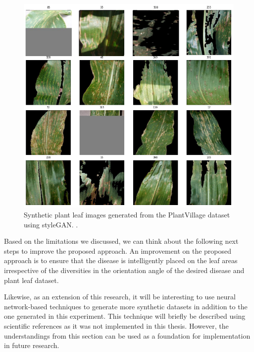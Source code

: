 \begin{figure}[!htb]
    \centering
    \includegraphics[scale=0.5, keepaspectratio]{Figures/notebook/bad-seg-dis.png}
    \caption{Synthetic plant leaf images generated from the PlantVillage dataset using styleGAN. \cite{arsenovic2019solving}.}
    \label{fig:my_bad_seg_img}
\end{figure} 




Based on the limitations we discussed, we can think about the following next steps to improve the proposed approach. 
An improvement on the proposed approach is to ensure that the disease is intelligently placed on the leaf areas irrespective of the diversities in the orientation angle of the desired disease and plant leaf dataset. 

Likewise, as an extension of this research, it will be interesting to use neural network-based techniques to generate more synthetic datasets in addition to the one generated in this experiment. This technique will briefly be described using scientific references as it was not implemented in this thesis. However, the understandings from this section can be used as a foundation for implementation in future research.

